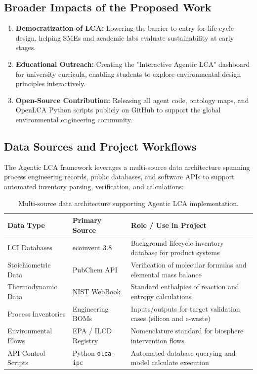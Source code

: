 \documentclass[11pt]{article}
\begin{document}
\subsection{Broader Impacts of the Proposed Work}
\begin{enumerate}
    \item \textbf{Democratization of LCA:} Lowering the barrier to entry for life cycle design, helping SMEs and academic labs evaluate sustainability at early stages.
    \item \textbf{Educational Outreach:} Creating the "Interactive Agentic LCA" dashboard for university curricula, enabling students to explore environmental design principles interactively.
    \item \textbf{Open-Source Contribution:} Releasing all agent code, ontology maps, and OpenLCA Python scripts publicly on GitHub to support the global environmental engineering community.
\end{enumerate}

\subsection{Data Sources and Project Workflows}
The Agentic LCA framework leverages a multi-source data architecture spanning process engineering records, public databases, and software APIs to support automated inventory parsing, verification, and calculations:
\begin{table}[htbp]
    \centering
    \small
    \begin{tabular}{lll}
        \toprule
        \textbf{Data Type} & \textbf{Primary Source} & \textbf{Role / Use in Project} \\
        \midrule
        LCI Databases & ecoinvent 3.8 & Background lifecycle inventory database for product systems \\
        Stoichiometric Data & PubChem API & Verification of molecular formulas and elemental mass balance \\
        Thermodynamic Data & NIST WebBook & Standard enthalpies of reaction and entropy calculations \\
        Process Inventories & Engineering BOMs & Inputs/outputs for target validation cases (silicon and e-waste) \\
        Environmental Flows & EPA / ILCD Registry & Nomenclature standard for biosphere intervention flows \\
        API Control Scripts & Python \texttt{olca-ipc} & Automated database querying and model calculate execution \\
        \bottomrule
    \end{tabular}
    \caption{Multi-source data architecture supporting Agentic LCA implementation.}
    \label{tab:data_sources}
\end{table}
\end{document}

